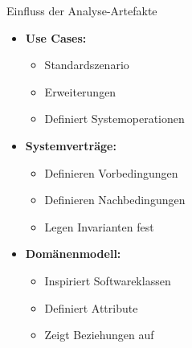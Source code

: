 \begin{concept}{Einfluss der Analyse-Artefakte}
\begin{itemize}
    \item \textbf{Use Cases:}
    \begin{itemize}
        \item Standardszenario
        \item Erweiterungen
        \item Definiert Systemoperationen
    \end{itemize}
    \item \textbf{Systemverträge:}
    \begin{itemize}
        \item Definieren Vorbedingungen
        \item Definieren Nachbedingungen
        \item Legen Invarianten fest
    \end{itemize}
    \item \textbf{Domänenmodell:}
    \begin{itemize}
        \item Inspiriert Softwareklassen
        \item Definiert Attribute
        \item Zeigt Beziehungen auf
    \end{itemize}
\end{itemize}
\end{concept}

